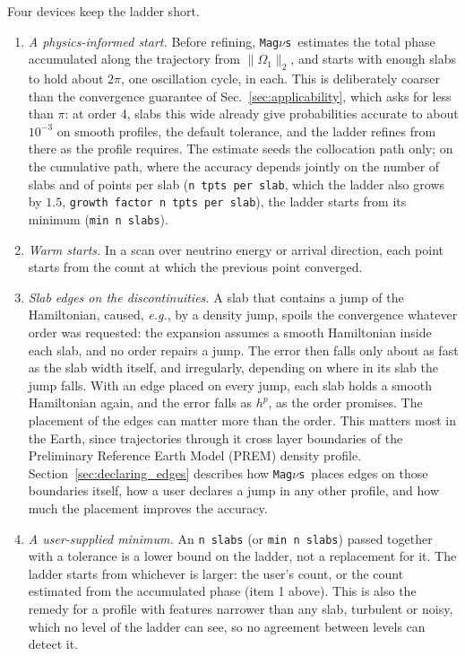 \documentclass[final,5p,times,twocolumn,sort,compress]{elsarticle}
\makeatletter
\newcommand{\eg}{{\it e.g.}}
\DeclareRobustCommand{\_}{%
  \ifmmode\nfss@text{\textunderscore}\else\textunderscore\allowbreak\fi}
\newcommand{\magnus}{{\tt Mag}\ensuremath{\nu}{\tt s}}
\makeatother
\begin{document}
Four devices keep the ladder short.
\begin{enumerate}
\item \textit{A physics-informed start.} Before refining, \magnus\ estimates the total phase accumulated along the trajectory from $\lVert \Omega_1 \rVert_2$, and starts with enough slabs to hold about $2\pi$, one oscillation cycle, in each. This is deliberately coarser than the convergence guarantee of Sec.~\ref{sec:applicability}, which asks for less than $\pi$: at order 4, slabs this wide already give probabilities accurate to about $10^{-3}$ on smooth profiles, the default tolerance, and the ladder refines from there as the profile requires. The estimate seeds the collocation path only; on the cumulative path, where the accuracy depends jointly on the number of slabs and of points per slab ({\tt n\_tpts\_per\_slab}, which the ladder also grows by $1.5$, {\tt growth\_factor\_n\_tpts\_per\_slab}), the ladder starts from its minimum ({\tt min\_n\_slabs}).
\item \textit{Warm starts.} In a scan over neutrino energy or arrival direction, each point starts from the count at which the previous point converged.
\item \textit{Slab edges on the discontinuities.} A slab that contains a jump of the Hamiltonian, caused, \eg, by a density jump, spoils the convergence whatever order was requested: the expansion assumes a smooth Hamiltonian inside each slab, and no order repairs a jump. The error then falls only about as fast as the slab width itself, and irregularly, depending on where in its slab the jump falls. With an edge placed on every jump, each slab holds a smooth Hamiltonian again, and the error falls as $h^{p}$, as the order promises. The placement of the edges can matter more than the order. This matters most in the Earth, since trajectories through it cross layer boundaries of the Preliminary Reference Earth Model (PREM) density profile. Section~\ref{sec:declaring_edges} describes how \magnus\ places edges on those boundaries itself, how a user declares a jump in any other profile, and how much the placement improves the accuracy.
\item \textit{A user-supplied minimum.} An {\tt n\_slabs} (or {\tt min\_n\_slabs}) passed together with a tolerance is a lower bound on the ladder, not a replacement for it. The ladder starts from whichever is larger: the user's count, or the count estimated from the accumulated phase (item 1 above). This is also the remedy for a profile with features narrower than any slab, turbulent or noisy, which no level of the ladder can see, so no agreement between levels can detect it.
\end{enumerate}
\end{document}
